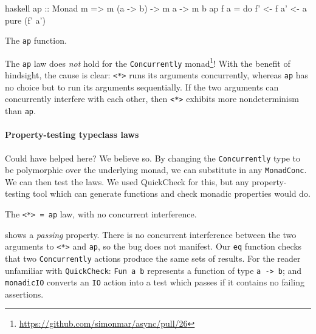 \begin{listing}
\centering
\begin{cminted}{haskell}
ap :: Monad m => m (a -> b) -> m a -> m b
ap f a = do
  f' <- f
  a' <- a
  pure (f' a')
\end{cminted}
\caption{The \texttt{ap} function.}\label{lst:ap}
\end{listing}

The \verb|ap| law does \emph{not} hold for the \verb|Concurrently|
monad\footnote{\url{https://github.com/simonmar/async/pull/26}}!  With
the benefit of hindsight, the cause is clear: \verb|<*>| runs its
arguments concurrently, whereas \verb|ap| has no choice but to run its
arguments sequentially.  If the two arguments can concurrently
interfere with each other, then \verb|<*>| exhibits more
nondeterminism than \verb|ap|.

\paragraph{Property-testing typeclass laws}
Could \dejafu{} have helped here?  We believe so.  By changing the
\verb|Concurrently| type to be polymorphic over the underlying monad,
we can substitute in any \verb|MonadConc|.  We can then test the laws.
We used QuickCheck \parencite{claessen2000} for this, but any
property-testing tool which can generate functions and check monadic
properties would do.

\begin{listing}
\centering
{}
\caption{The \texttt{<*> = ap} law, with no concurrent interference.}\label{lst:aplaw1}
\end{listing}

 shows a \emph{passing} property.  There is no
concurrent interference between the two arguments to \verb|<*>| and
\verb|ap|, so the bug does not manifest.  Our \verb|eq| function
checks that two \verb|Concurrently| actions produce the same sets of
results.  For the reader unfamiliar with \verb|QuickCheck|:
\verb|Fun a b| represents a function of type \verb|a -> b|; and
\verb|monadicIO| converts an \verb|IO| action into a test which passes
if it contains no failing assertions.

